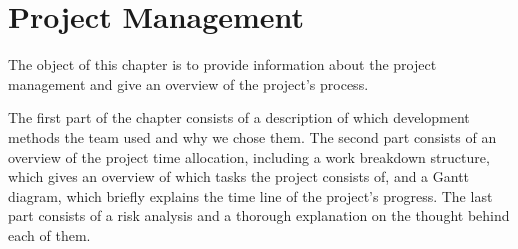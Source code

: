 \chapter{Project Management}
The object of this chapter is to provide information about the project management and give an overview of the project's process. 

The first part of the chapter consists of a description of which development methods the team used and why we chose them. The second part consists of an overview of the project time allocation, including a work breakdown structure, which gives an overview of which tasks the project consists of, and a Gantt diagram, which briefly explains the time line of the project's progress. The last part consists of a risk analysis and a thorough explanation on the thought behind each of them.




\newpage



